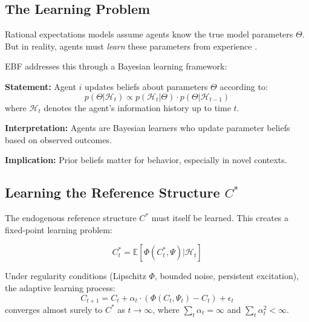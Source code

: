 \subsection{The Learning Problem}

Rational expectations models assume agents know the true model parameters
$\Theta$. But in reality, agents must \textit{learn} these parameters from
experience \citep{sargent1993bounded, evans2001learning}.

EBF addresses this through a Bayesian learning framework:

\begin{tcolorbox}[colback=gray!5!white, colframe=gray!75!black,
    title=Axiom AZ-L1: Bayesian Parameter Learning]
\textbf{Statement:} Agent $i$ updates beliefs about parameters $\Theta$ according to:
\begin{equation}
p(\Theta | \mathcal{H}_t) \propto p(\mathcal{H}_t | \Theta) \cdot p(\Theta | \mathcal{H}_{t-1})
\end{equation}
where $\mathcal{H}_t$ denotes the agent's information history up to time $t$.

\textbf{Interpretation:} Agents are Bayesian learners who update parameter beliefs
based on observed outcomes.

\textbf{Implication:} Prior beliefs matter for behavior, especially in novel contexts.
\end{tcolorbox}

\subsection{Learning the Reference Structure $C^*$}

The endogenous reference structure $C^*$ must itself be learned. This creates
a fixed-point learning problem:

\begin{equation}
C^*_t = \mathbb{E}[\Phi(C^*_t, \Psi) | \mathcal{H}_t]
\end{equation}

\begin{proposition}
Under regularity conditions (Lipschitz $\Phi$, bounded noise, persistent excitation),
the adaptive learning process:
\begin{equation}
C_{t+1} = C_t + \alpha_t \cdot (\Phi(C_t, \Psi_t) - C_t) + \epsilon_t
\end{equation}
converges almost surely to $C^*$ as $t \to \infty$, where $\sum_t \alpha_t = \infty$
and $\sum_t \alpha_t^2 < \infty$.
\end{proposition}

